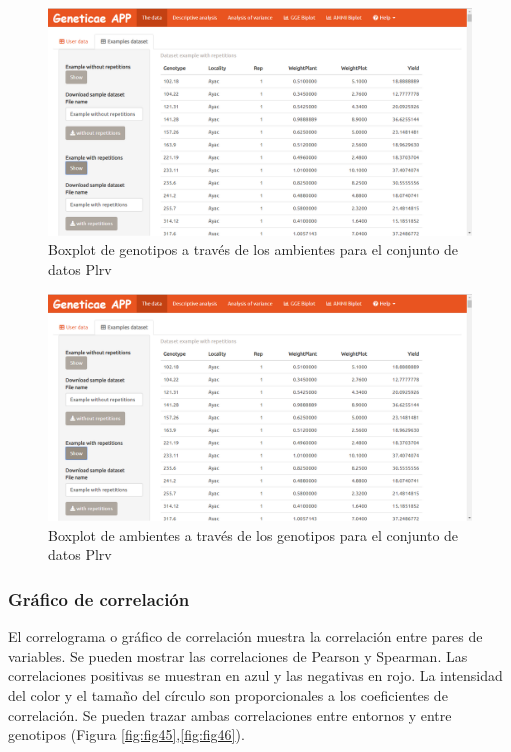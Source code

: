 \begin{figure}[H]
	\begin{center}
		\includegraphics[width=17cm]{./Graficos/Exampledatasets_withrep.png}
	\end{center}
	\caption{Boxplot de genotipos a través de los ambientes para el conjunto de datos Plrv}
	\label{fig:fig43}
\end{figure}


\begin{figure}[H]
	\begin{center}
		\includegraphics[width=17cm]{./Graficos/Exampledatasets_withrep.png}
	\end{center}
	\caption{Boxplot de ambientes a través de los genotipos para el conjunto de datos Plrv}
	\label{fig:fig44}
\end{figure}

\subsubsection{Gráfico de correlación}
El correlograma o gráfico de correlación muestra la correlación entre pares de variables. Se pueden mostrar las correlaciones de Pearson y Spearman. Las correlaciones positivas se muestran en azul y las negativas en rojo. La intensidad del color y el tamaño del círculo son proporcionales a los coeficientes de correlación. Se pueden trazar ambas correlaciones entre entornos y entre genotipos (Figura \ref{fig:fig45},\ref{fig:fig46}).


